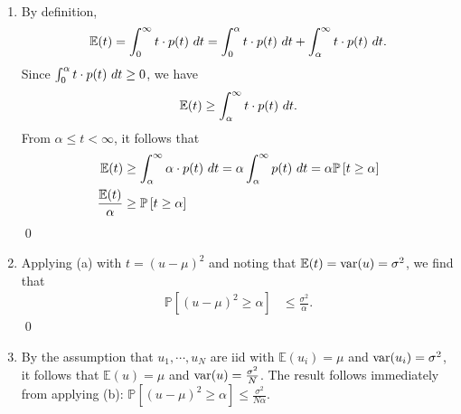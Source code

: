 \documentclass{amsart}
\begin{document}
\begin{solution}\ 
  \begin{enumerate}
    \item By definition,
      \begin{equation*}
        \mathbb{E}(t)
          = \int_0^{\infty} t \cdot p(t) \textup{ } dt
          = \int_0^{\alpha} t \cdot p(t) \textup{ } dt +
            \int_{\alpha}^{\infty} t \cdot p(t) \textup{ } dt.
      \end{equation*}
      Since \(\int_{0}^{\alpha} t \cdot p(t) \textup{ } dt \geq 0\), we have
      \begin{equation*}
        \mathbb{E}(t) \geq \int_{\alpha}^{\infty} t \cdot p(t) \textup{ } dt.
      \end{equation*}
      From \(\alpha \leq t < \infty\), it follows that
      \begin{align*}
        \mathbb{E}(t)
          &\geq \int_{\alpha}^{\infty} \alpha \cdot p(t) \textup{ } dt
          = \alpha \int_{\alpha}^{\infty} p(t) \textup{ } dt
          = \alpha \mathbb{P}\left[t \geq \alpha\right] \\
        \frac{\mathbb{E}(t)}{\alpha}
          &\geq \mathbb{P}\left[t \geq \alpha\right]
      \end{align*}
      \qed
    \item Applying (a) with \(t = (u-\mu)^2\) and noting that
      \(\mathbb{E}(t) = \textup{var}(u) = \sigma^2\), we find that
      \begin{align*}
        \mathbb{P}\left[(u - \mu)^2 \geq \alpha\right]
          &\leq \frac{\sigma^2}{\alpha}.
      \end{align*}
      \qed
    \item By the assumption that \(u_1, \cdots, u_N\) are iid with
      \(\mathbb{E}(u_i) = \mu\) and \(\textup{var}(u_i) = \sigma^2\), it follows
      that \(\mathbb{E}(u) = \mu\) and \(\textup{var}(u) = \frac{\sigma^2}{N}\).
      The result follows immediately from applying (b):
      \(\mathbb{P}\left[(u - \mu)^2 \geq \alpha \right] \leq
      \frac{\sigma^2}{N \alpha}\).
  \end{enumerate}
\end{solution}
\end{document}
